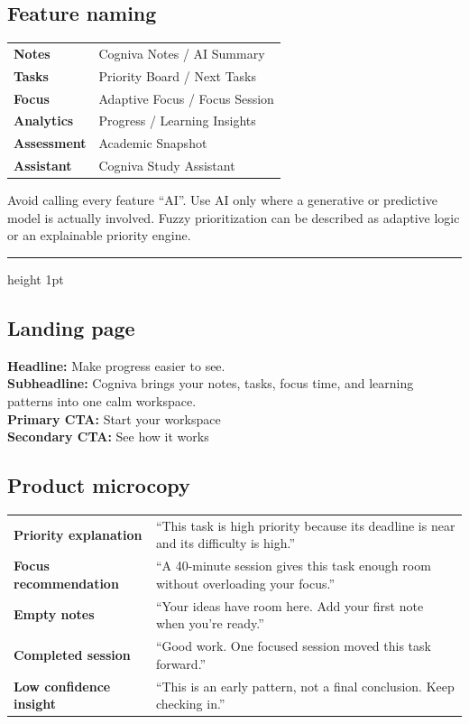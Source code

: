\documentclass[11pt,a4paper]{article}
\newcommand{\sectiontitle}[1]{\vspace{4pt}{\color{CognivaForest}\LARGE\bfseries #1}\par\vspace{5pt}\hrule height 1pt\vspace{10pt}}
\begin{document}
\subsection*{Feature naming}
\begin{tabularx}{\textwidth}{>{\bfseries}p{4cm}X}
Notes & Cogniva Notes / AI Summary\\
Tasks & Priority Board / Next Tasks\\
Focus & Adaptive Focus / Focus Session\\
Analytics & Progress / Learning Insights\\
Assessment & Academic Snapshot\\
Assistant & Cogniva Study Assistant
\end{tabularx}

Avoid calling every feature “AI”. Use AI only where a generative or predictive model is actually involved. Fuzzy prioritization can be described as adaptive logic or an explainable priority engine.

\newpage\sectiontitle{08 — Copy examples}
\subsection*{Landing page}
\textbf{Headline:} Make progress easier to see.\\
\textbf{Subheadline:} Cogniva brings your notes, tasks, focus time, and learning patterns into one calm workspace.\\
\textbf{Primary CTA:} Start your workspace\\
\textbf{Secondary CTA:} See how it works

\subsection*{Product microcopy}
\begin{tabularx}{\textwidth}{>{\bfseries}p{4cm}X}
Priority explanation & “This task is high priority because its deadline is near and its difficulty is high.”\\
Focus recommendation & “A 40-minute session gives this task enough room without overloading your focus.”\\
Empty notes & “Your ideas have room here. Add your first note when you’re ready.”\\
Completed session & “Good work. One focused session moved this task forward.”\\
Low confidence insight & “This is an early pattern, not a final conclusion. Keep checking in.”
\end{tabularx}
\end{document}
